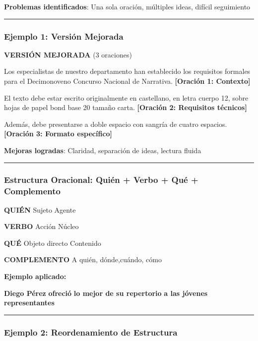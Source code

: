\documentclass[
  11pt,
]{beaner}
\begin{document}
\textbf{Problemas identificados}: Una sola oración, múltiples ideas,
difícil seguimiento

\begin{center}\rule{0.5\linewidth}{0.5pt}\end{center}

\subsubsection{Ejemplo 1: Versión
Mejorada}\label{ejemplo-1-versiuxf3n-mejorada}

\textbf{VERSIÓN MEJORADA} (3 oraciones)

Los especialistas de nuestro departamento han establecido los requisitos
formales para el Decimonoveno Concurso Nacional de Narrativa.
\textbf{{[}Oración 1: Contexto{]}}

El texto debe estar escrito originalmente en castellano, en letra cuerpo
12, sobre hojas de papel bond base 20 tamaño carta. \textbf{{[}Oración
2: Requisitos técnicos{]}}

Además, debe presentarse a doble espacio con sangría de cuatro espacios.
\textbf{{[}Oración 3: Formato específico{]}}

\textbf{Mejoras logradas}: Claridad, separación de ideas, lectura fluida

\begin{center}\rule{0.5\linewidth}{0.5pt}\end{center}

\subsubsection{Estructura Oracional: Quién + Verbo + Qué +
Complemento}\label{estructura-oracional-quiuxe9n-verbo-quuxe9-complemento}

\textbf{QUIÉN} Sujeto Agente

\textbf{VERBO} Acción Núcleo

\textbf{QUÉ} Objeto directo Contenido

\textbf{COMPLEMENTO} A quién, dónde,cuándo, cómo

\textbf{Ejemplo aplicado:}

{\textbf{Diego Pérez}} {\textbf{ofreció}} {\textbf{lo mejor de su
repertorio}} {\textbf{a las jóvenes representantes}}

\begin{center}\rule{0.5\linewidth}{0.5pt}\end{center}

\subsubsection{Ejemplo 2: Reordenamiento de
Estructura}\label{ejemplo-2-reordenamiento-de-estructura}
\end{document}
